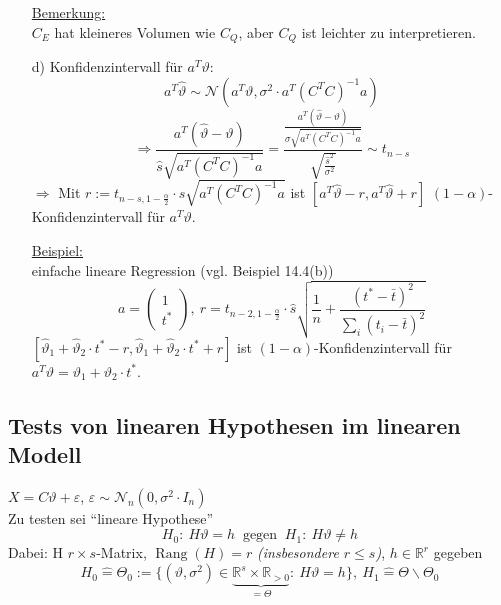 \documentclass[a4paper,11pt,twoside,titlepage]{article}
\newcommand{\R}{{\mathbb R}}
\newcommand\NN{ \mathcal{N} } %
\begin{document}
\begin{itemize}
\underline{Bemerkung:}\\
$C_E$ hat kleineres Volumen wie $C_Q$, aber $C_Q$ ist leichter zu interpretieren.
\item[d)] Konfidenzintervall für $a^T\vartheta$:
\[a^T\hat\vartheta\sim\NN(a^T\vartheta,\sigma^2\cdot a^T(C^TC)^{-1}a)\]
\[\Rightarrow \frac{a^T(\hat\vartheta-\vartheta)}{\hat s\sqrt{a^T(C^TC)^{-1}a}}=\frac{\frac{a^T(\hat\vartheta-\vartheta)}{\sigma\sqrt{a^T(C^TC)^{-1}a}}}{\sqrt{\frac{\hat s^2}{\sigma^2}}}\sim t_{n-s}\]
$\Rightarrow$ Mit $r:=t_{n-s,1-\frac\alpha2}\cdot\hat s\sqrt{a^T(C^TC)^{-1}a}$ ist $[a^T\hat\vartheta-r,a^T\hat\vartheta+r]$ $(1-\alpha)$-Konfidenzintervall für $a^T\vartheta$.

\underline{Beispiel:}\\
einfache lineare Regression (vgl. Beispiel 14.4(b))
\[a=\left(\begin{array}{c}1\\t^\ast\end{array}\right),\ r=t_{n-2,1-\frac\alpha2}\cdot \hat s\sqrt{\frac1n+\frac{(t^\ast-\bar t)^2}{\sum_i(t_i-\bar t)^2}}\]
$[\hat\vartheta_1+\hat\vartheta_2\cdot t^\ast-r,\hat\vartheta_1+\hat\vartheta_2\cdot t^\ast+r]$ ist $(1-\alpha)$-Konfidenzintervall für $a^T\vartheta=\vartheta_1+\vartheta_2\cdot t^\ast$.
\end{itemize}

\subsection{Tests von linearen Hypothesen im linearen Modell}
$X=C\vartheta+\varepsilon$, $\varepsilon\sim\NN_n(0,\sigma^2\cdot I_n)$\\
Zu testen sei "`lineare Hypothese"'
\[H_0:\ H\vartheta=h\ \mbox{ gegen }\ H_1:\ H\vartheta\neq h\]
Dabei: H $r\times s$-Matrix, $\operatorname{Rang}(H)=r$ \textit{(insbesondere $r\leq s$)}, $h\in\R^r$ gegeben
\[H_0\hat{=}\Theta_0:=\{(\vartheta,\sigma^2)\in\underbrace{\R^s\times\R_{>0}}_{=\Theta}:\ H\vartheta=h\},\ H_1\hat{=}\Theta\backslash\Theta_0\]
\end{document}
